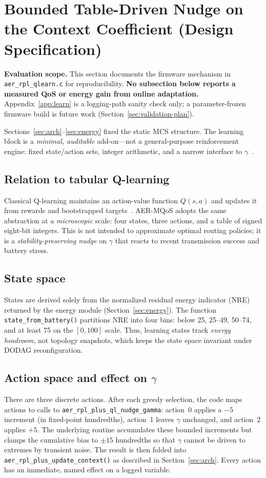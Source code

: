\section{Bounded Table-Driven Nudge on the Context Coefficient (Design Specification)}
\label{sec:ql}

\noindent\textbf{Evaluation scope.} This section documents the firmware mechanism in \texttt{aer\_rpl\_qlearn.c} for reproducibility. \textbf{No subsection below reports a measured QoS or energy gain from online adaptation.} Appendix~\ref{app:learn} is a logging-path sanity check only; a parameter-frozen firmware build is future work (Section~\ref{sec:validation-plan}).

Sections~\ref{sec:arch}--\ref{sec:energy} fixed the static MCS structure. The learning block is a \emph{minimal, auditable} add-on---not a general-purpose reinforcement engine: fixed state/action sets, integer arithmetic, and a narrow interface to $\gamma$~\cite{osterlind2006cooja,oikonomou2022contik}.

\subsection{Relation to tabular Q-learning}
Classical Q-learning maintains an action-value function $Q(s,a)$ and updates it from rewards and bootstrapped targets~\cite{watkins1992qlearning}. AER-MQoS adopts the same abstraction at a \emph{microscopic} scale: four states, three actions, and a table of signed eight-bit integers. This is not intended to approximate optimal routing policies; it is a \emph{stability-preserving nudge} on $\gamma$ that reacts to recent transmission success and battery stress.

\subsection{State space}
States are derived solely from the normalized residual energy indicator (NRE) returned by the energy module (Section~\ref{sec:energy}). The function \texttt{state\_from\_battery()} partitions NRE into four bins: below 25, 25--49, 50--74, and at least 75 on the $[0,100]$ scale. Thus, learning states track \emph{energy headroom}, not topology snapshots, which keeps the state space invariant under DODAG reconfiguration.

\subsection{Action space and effect on \texorpdfstring{$\gamma$}{gamma}}
There are three discrete actions. After each greedy selection, the code maps actions to calls to \texttt{aer\_rpl\_plus\_ql\_nudge\_gamma}: action~0 applies a $-5$ increment (in fixed-point hundredths), action~1 leaves $\gamma$ unchanged, and action~2 applies $+5$. The underlying routine accumulates these bounded increments but clamps the cumulative bias to $\pm 15$ hundredths so that $\gamma$ cannot be driven to extremes by transient noise. The result is then folded into \texttt{aer\_rpl\_plus\_update\_context()} as described in Section~\ref{sec:arch}. Every action has an immediate, named effect on a logged variable.

